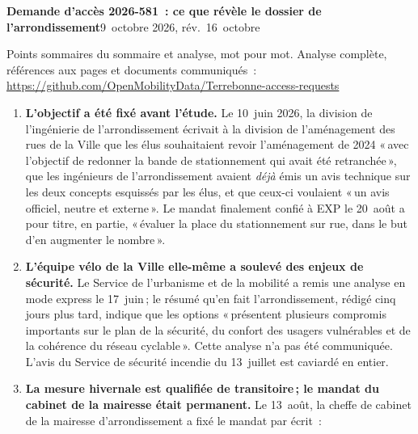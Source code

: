 \documentclass[10pt,letterpaper]{article}
\newcommand{\repourl}{https://github.com/OpenMobilityData/Terrebonne-access-requests}
\newcommand{\repo}[1]{\href{\repourl}{#1}}
\begin{document}
{\large\bfseries Demande d'accès 2026-581~: ce que révèle le dossier de l'arrondissement}\hfill{\small 9~octobre 2026, rév.\ 16~octobre}

\vspace{-0.2em}
{\small Points sommaires du sommaire et analyse, mot pour mot. Analyse complète, références aux pages et documents communiqués~:\\ \repo{\repourl}}
\vspace{0.4em}

\begin{enumerate}[nosep,itemsep=0.3em,leftmargin=1.4em]
  \item \begin{minipage}[t]{\linewidth}\textbf{L'objectif a été fixé avant l'étude.} Le 10~juin 2026, la
    division de l'ingénierie de l'arrondissement écrivait à la division de
    l'aménagement des rues de la Ville que les élus souhaitaient revoir
    l'aménagement de 2024 «\,avec l'objectif de redonner la bande de
    stationnement qui avait été retranchée\,», que les ingénieurs de
    l'arrondissement avaient \emph{déjà} émis un avis technique sur les deux
    concepts esquissés par les élus, et que ceux-ci voulaient «\,un avis
    officiel, neutre et externe\,». Le mandat finalement confié à EXP le
    20~août a pour titre, en partie, «\,évaluer la place du stationnement sur
    rue, dans le but d'en augmenter le nombre\,».\end{minipage}\vspace{0.35em}
\item \begin{minipage}[t]{\linewidth}\textbf{L'équipe vélo de la Ville elle-même a soulevé des enjeux
    de sécurité.} Le Service de l'urbanisme et de la mobilité a remis une
    analyse en mode express le 17~juin\,; le résumé qu'en fait
    l'arrondissement, rédigé cinq jours plus tard, indique que les options
    «\,présentent plusieurs compromis importants sur le plan de la sécurité,
    du confort des usagers vulnérables et de la cohérence du réseau
    cyclable\,». Cette analyse n'a pas été communiquée. L'avis du Service de
    sécurité incendie du 13~juillet est caviardé en entier.\end{minipage}\vspace{0.35em}
\item \begin{minipage}[t]{\linewidth}\textbf{La mesure hivernale est qualifiée de transitoire\,; le
    mandat du cabinet de la mairesse était permanent.} Le 13~août, la cheffe
    de cabinet de la mairesse d'arrondissement a fixé le mandat par écrit~:

\end{minipage}
\end{enumerate}
\end{document}
